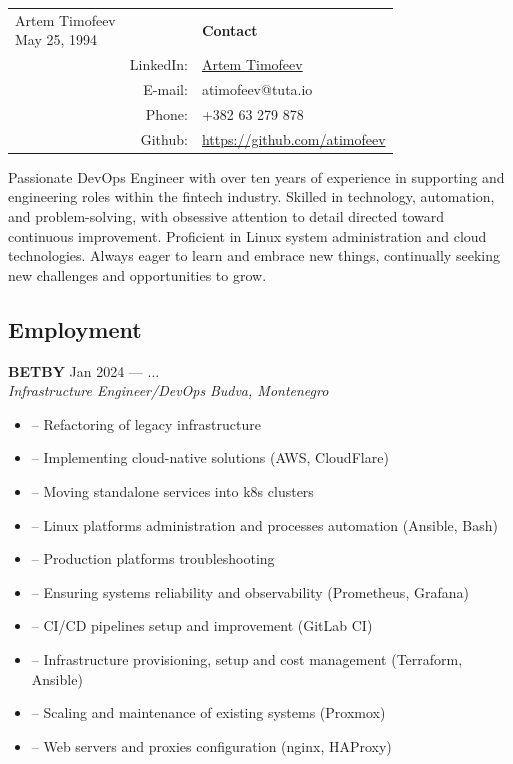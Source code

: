\documentclass[10pt]{report}
\newenvironment{JobDescription}[5]{
    \vspace{ #5 }
    \flushleft
    {\bf #1 } \hfill { #2 }
    \\
    {\em #3 } \hfill {\em #4 }
    \begin{itemize}
} {
    \end{itemize}
}
\begin{document}
\begin{tabular}{@{}p{}rp{}}
    \bf{\LARGE{Artem Timofeev} \newline{\small{May 25, 1994}}} & & {\bf Contact} \\
    & {\small LinkedIn:}    & {\small \href{https://linkedin.com/in/artem-timofeev-240b7a14b/}{Artem Timofeev}} \\
    & {\small E-mail:}      & {\small atimofeev@tuta.io} \\
    & {\small Phone:}       & {\small +382 63 279 878} \\
    & {\small Github:}      & {\small \href{https://github.com/atimofeev}{https://github.com/atimofeev}}
\end{tabular}

\vspace{10mm}
{\noindent
    Passionate DevOps Engineer with over ten years of experience in supporting and engineering roles within the fintech industry. Skilled in technology, automation, and problem-solving, with obsessive attention to detail directed toward continuous improvement. Proficient in Linux system administration and cloud technologies. Always eager to learn and embrace new things, continually seeking new challenges and opportunities to grow.
}
\vspace{5mm}

\subsection*{Employment}
\begin{JobDescription}{BETBY}{Jan 2024 --- ...}{Infrastructure Engineer/DevOps}{Budva, Montenegro}{0mm}
  \item[--] Refactoring of legacy infrastructure
  \item[--] Implementing cloud-native solutions (AWS, CloudFlare)
  \item[--] Moving standalone services into k8s clusters
  \item[--] Linux platforms administration and processes automation (Ansible, Bash)
  \item[--] Production platforms troubleshooting
  \item[--] Ensuring systems reliability and observability (Prometheus, Grafana)
  \item[--] CI/CD pipelines setup and improvement (GitLab CI)
  \item[--] Infrastructure provisioning, setup and cost management (Terraform, Ansible)
  \item[--] Scaling and maintenance of existing systems (Proxmox)
  \item[--] Web servers and proxies configuration (nginx, HAProxy)
\end{JobDescription}
\end{document}
